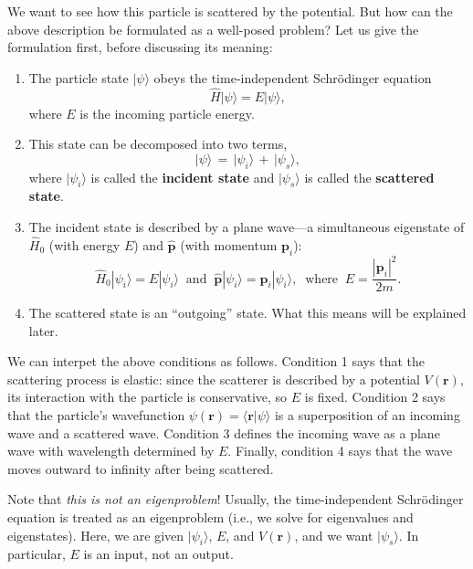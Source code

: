 \documentclass[pra,12pt]{revtex4}
\begin{document}
We want to see how this particle is scattered by the potential.  But
how can the above description be formulated as a well-posed problem?
Let us give the formulation first, before discussing its meaning:
\begin{enumerate}
\item 
The particle state $|\psi\rangle$ obeys the time-independent
Schr\"odinger equation
\begin{equation}
  \hat{H} |\psi\rangle = E |\psi\rangle,
\end{equation}
where $E$ is the incoming particle energy.

\item
This state can be decomposed into two terms,
\begin{equation}
  |\psi\rangle \,=\, |\psi_i\rangle \,+\, |\psi_s\rangle,
\end{equation}
where $|\psi_i\rangle$ is called the \textbf{incident state} and
$|\psi_s\rangle$ is called the \textbf{scattered state}.

\item
The incident state is described by a plane wave---a simultaneous
eigenstate of $\hat{H}_0$ (with energy $E$) and $\hat{\mathbf{p}}$
(with momentum $\mathbf{p}_i$):
\begin{equation}
  \hat{H}_0 |\psi_i\rangle = E |\psi_i\rangle \;\; \mathrm{and}\;\;
  \hat{\mathbf{p}} |\psi_i\rangle = \mathbf{p}_i |\psi_i\rangle,
  \;\; \mathrm{where}\;\; E = \frac{|\mathbf{p}_i|^2}{2m}.
\end{equation}

\item
The scattered state is an ``outgoing'' state.  What this means will be
explained later.
\end{enumerate}
We can interpet the above conditions as follows.  Condition 1 says
that the scattering process is elastic: since the scatterer is
described by a potential $V(\mathbf{r})$, its interaction with the
particle is conservative, so $E$ is fixed.  Condition 2 says that the
particle's wavefunction $\psi(\mathbf{r}) = \langle \mathbf{r}
|\psi\rangle$ is a superposition of an incoming wave and a scattered
wave.  Condition 3 defines the incoming wave as a plane wave with
wavelength determined by $E$.  Finally, condition 4 says that the wave
moves outward to infinity after being scattered.

Note that \textit{this is not an eigenproblem}!  Usually, the
time-independent Schr\"odinger equation is treated as an eigenproblem
(i.e., we solve for eigenvalues and eigenstates).  Here, we are given
$|\psi_i\rangle$, $E$, and $V(\mathbf{r})$, and we want
$|\psi_s\rangle$.  In particular, $E$ is an input, not an output.
\end{document}
